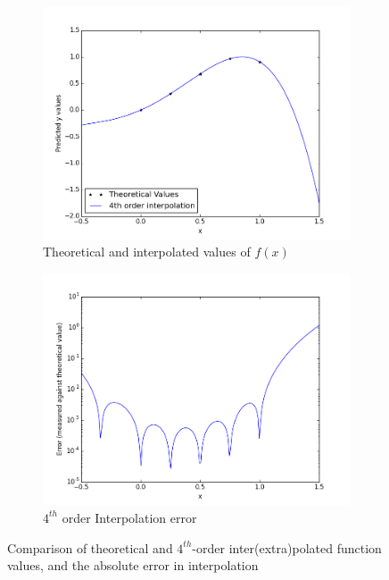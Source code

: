 \documentclass[11pt]{article}
\begin{document}
\begin{figure}
        \centering
        \begin{subfigure}{.5\textwidth}
  \centering
        \includegraphics[width=\linewidth]{q1/interpol.png}
                \caption{Theoretical and interpolated values of $f(x)$}
                \label{fig:q1_inter}
                \end{subfigure}%
\begin{subfigure}{.5\textwidth}
  \centering
        \includegraphics[width=\linewidth]{q1/error_log.png}
                \caption{$4^{th}$ order Interpolation error}
                \label{fig:q1_error}
	\end{subfigure}
            
\caption{Comparison of theoretical and $4^{th}$-order inter(extra)polated function values, and the absolute error in interpolation}
\label{fig:q1}            
\end{figure}
\end{document}
